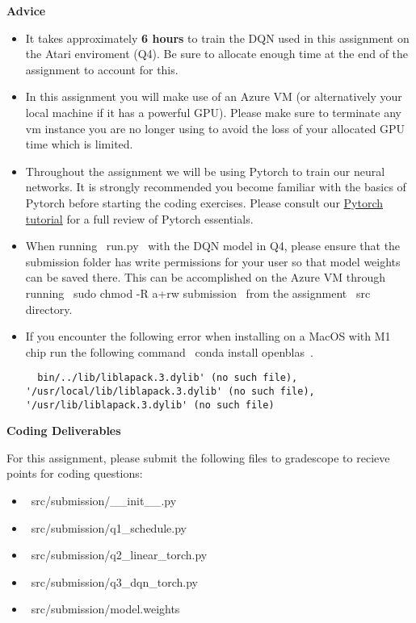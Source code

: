 \textbf{Advice}
\begin{itemize}
  \item It takes approximately \textbf{6 hours} to train the DQN used in this assignment on the Atari enviroment (Q4). Be sure to allocate enough time at the end of the assignment to account for this.

  \item In this assignment you will make use of an Azure VM (or alternatively your local machine if it has a powerful GPU). Please make sure to terminate any vm instance you are no longer using to avoid the loss of your allocated GPU time which is limited.

  \item Throughout the assignment we will be using Pytorch to train our neural networks. It is strongly recommended you become familiar with the basics of Pytorch before starting the coding exercises. Please consult our \href{https://colab.research.google.com/drive/1BZ89PnXpzN2US_OxwuQCazucmuTpuIfS?usp=sharing}{Pytorch tutorial} for a full review of Pytorch essentials.

  \item When running ~run.py~ with the DQN model in Q4, please ensure that the submission folder has write permissions for your user so that model weights can be saved there. This can be accomplished on the Azure VM through running ~sudo chmod -R a+rw submission~ from the assignment ~src~ directory.

  \item If you encounter the following error when installing on a MacOS with M1 chip run the following command ~conda install openblas~.

  \begin{lstlisting}
  bin/../lib/liblapack.3.dylib' (no such file), '/usr/local/lib/liblapack.3.dylib' (no such file), '/usr/lib/liblapack.3.dylib' (no such file)
  \end{lstlisting}
\end{itemize}


\textbf{Coding Deliverables}

For this assignment, please submit the following files to gradescope to recieve points for coding questions:
\begin{itemize}
    \item ~src/submission/__init__.py~
    \item ~src/submission/q1_schedule.py~
    \item ~src/submission/q2_linear_torch.py~
    \item ~src/submission/q3_dqn_torch.py~
    \item ~src/submission/model.weights~
\end{itemize}
